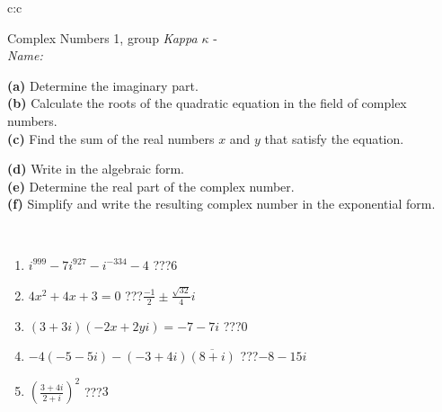 \documentclass[10pt]{report}
\begin{document}
\begin{tabular}{c:c}
\\ \hdashline
\begin{minipage}[c][104.5mm][t]{0.5\linewidth}
\begin{center}
\vspace{5mm}
{\huge Complex Numbers 1, group \textit{Kappa $\kappa$} -}\\[5mm]
\textit{Name:}\phantom{xxxxxxxxxxxxxxxxxxxxxxxxxxxxxxxxxxxxxxxxxxxxxxxxxxxxxxxxxxxxxxxxx}\\[5mm]
\begin{minipage}{0.95\linewidth}
\begin{center}
{\small \begin{minipage}{0.44\textwidth} \raggedright
\textbf{(a)} Determine the imaginary part. \\[1mm]
\textbf{(b)} Calculate the roots of the quadratic equation in the field of complex numbers. \\[1mm]
\textbf{(c)} Find the sum of the real numbers \(x\) and \(y\) that satisfy the equation. \end{minipage} \begin{minipage}{0.54\textwidth}
\textbf{(d)} Write in the algebraic form. \\[1mm]
\textbf{(e)} Determine the real part of the complex number. \\[1mm]
\textbf{(f)} Simplify and write the resulting complex number in the exponential form.
\end{minipage}
} \vspace{3mm}
\end{center}
\end{minipage}
\\[1mm]
\begin{minipage}{0.79\linewidth}
\begin{center}
\begin{varwidth}{\linewidth}
\setlength{\itemsep}{0pt}
\begin{enumerate}
\large
\item $i^{999}-7i^{927}-i^{-334}-4$\quad \dotfill\; ???\;\dotfill \quad $6$
\item $4x^2+4x+3=0$\quad \dotfill\; ???\;\dotfill \quad $\frac{-1}{2} \pm{}\frac{ \sqrt{32}}{4}i$
\item $(3+3i)(-2x+2yi)=-7-7i$\quad \dotfill\; ???\;\dotfill \quad $0$
\item $-4(-5-5i)-(-3+4i)\overline{(8+i)}$\quad \dotfill\; ???\;\dotfill \quad $-8-15i$
\item $\left(\frac{3+4i}{2+i}\right)^2$\quad \dotfill\; ???\;\dotfill \quad $3$

\end{enumerate}
\end{varwidth}
\end{center}
\end{minipage}
\end{center}
\end{minipage}
\end{tabular}
\end{document}
